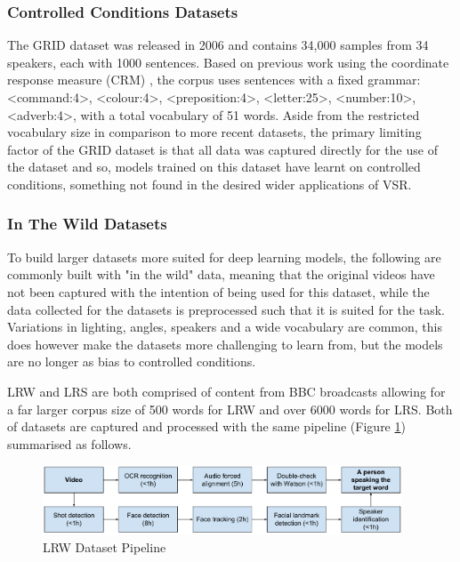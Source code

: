 \documentclass[12pt]{report}
\begin{document}
\subsubsection{Controlled Conditions Datasets}
The GRID dataset was released in 2006 \cite{Cooke2006} and contains 34,000 samples from 34 speakers, each with 1000 sentences.
Based on previous work using the coordinate response measure (CRM) \cite{Bolia2000}, the corpus uses sentences with a fixed grammar: <command:4>, <colour:4>, <preposition:4>, <letter:25>, <number:10>, <adverb:4>, with a total vocabulary of 51 words.
Aside from the restricted vocabulary size in comparison to more recent datasets, the primary limiting factor of the GRID dataset is that all data was captured directly for the use of the dataset and so, models trained on this dataset have learnt on controlled conditions, something not found in the desired wider applications of VSR.

\subsubsection{In The Wild Datasets}
To build larger datasets more suited for deep learning models, the following are commonly built with "in the wild" data, meaning that the original videos have not been captured with the intention of being used for this dataset, while the data collected for the datasets is preprocessed such that it is suited for the task.
Variations in lighting, angles, speakers and a wide vocabulary are common, this does however make the datasets more challenging to learn from, but the models are no longer as bias to controlled conditions.

LRW and LRS are both comprised of content from BBC broadcasts \cite{Chung2016, Chung2017} allowing for a far larger corpus size of 500 words for LRW and over 6000 words for LRS.
Both of datasets are captured and processed with the same pipeline (Figure \ref{fig:LRW_Pipeline}) summarised as follows. 

\begin{figure}[h]
    \centering
        \includegraphics[width=0.95\textwidth]{figures/lrw_pipeline.png}
    \caption{LRW Dataset Pipeline \cite{Chung2016}}\label{fig:LRW_Pipeline}
\end{figure}
\end{document}
